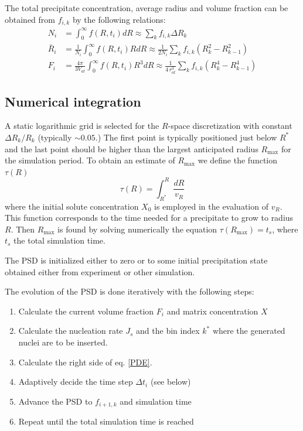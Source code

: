 \documentclass[12pt,a4paper]{article}
\begin{document}
The total precipitate concentration, average radius and volume fraction can be obtained from $f_{i,k}$ by the following relations:
\begin{subequations}
	\begin{align}
N_i &= \int_0^\infty f(R,t_i) dR 
\approx \sum_k { f_{i,k} \Delta R_k } \\
\bar{R}_i &= \frac{1}{N_i}\int_0^\infty f(R,t_i) R dR
\approx \frac{1}{2 N_i}\sum_k { f_{i,k} (R_k^2-R_{k-1}^2 ) }  \\
F_i &= \frac{4\pi}{3V_{at}} \int_0^\infty f(R,t_i) R^3 dR
\approx \frac{1}{4\, r_{at}^3} \sum_k { f_{i,k} (R_k^4-R_{k-1}^4 )  } 
	\end{align}
\end{subequations}

\subsection{Numerical integration}

A static logarithmic grid is selected for the $R$-space discretization with constant $\Delta R_k / R_k$ (typically $\sim 0.05$.) The first point is typically positioned just below $R^*$ and the last point should be higher than the largest anticipated radius $R_{\max}$ for the simulation period. To obtain an estimate of $R_{\max}$ we define the function $\tau(R)$
\[
\tau(R) = \int_{R^*}^{R}{\frac{dR}{v_R}}
\] 
where the initial solute concentration $X_0$ is employed in the evaluation of $v_R$. This function corresponds to the time needed for a precipitate to grow to radius $R$. Then $R_{\max}$ is found by solving numerically the equation $\tau(R_{\max}) = t_s$, where $t_s$ the total simulation time.

The PSD is initialized either to zero or to some initial precipitation state obtained either from experiment or other simulation.

The evolution of the PSD is done iteratively with the following steps:
\begin{enumerate}
\item Calculate the current volume fraction $F_i$ and matrix concentration $X$
\item Calculate the nucleation rate $J_s$ and the bin index $k^*$ where the generated nuclei are to be inserted.
\item Calculate the right side of eq. \eqref{PDE}.
\item Adaptively decide the time step $\Delta t_i$ (see below)
\item Advance the PSD to $f_{i+1,k}$ and simulation time
\item Repeat until the total simulation time is reached 
\end{enumerate}
\end{document}
